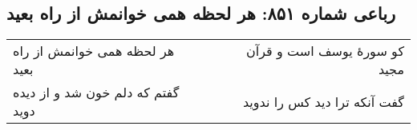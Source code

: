 \begin{center}
\section*{رباعی شماره ۸۵۱: هر لحظه همی خوانمش از راه بعید}
\label{sec:0851}
\begin{longtable}{l p{0.5cm} r}
هر لحظه همی خوانمش از راه بعید
&&
کو سورهٔ یوسف است و قرآن مجید
\\
گفتم که دلم خون شد و از دیده دوید
&&
گفت آنکه ترا دید کس را ندوید
\\
\end{longtable}
\end{center}
